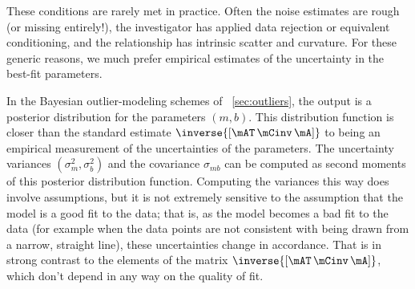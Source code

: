 \documentclass[12pt,twoside,pdftex]{article}
\begin{document}
These conditions are rarely met in practice.  Often the noise
estimates are rough (or missing entirely!), the investigator has
applied data rejection or equivalent conditioning, and the
relationship has intrinsic scatter and curvature.  For these
generic reasons, we much prefer empirical estimates of the uncertainty
in the best-fit parameters.

In the Bayesian outlier-modeling schemes of
\sectionname~\ref{sec:outliers}, the output is a
posterior distribution for the parameters $(m,b)$.  This distribution
function is closer than the standard estimate
$\inverse{\left[\mAT\,\mCinv\,\mA\right]}$ to being an
empirical measurement of the uncertainties of the parameters.  The
uncertainty variances $(\sigma_m^2,\sigma_b^2)$ and the covariance
$\sigma_{mb}$ can be computed as second moments of this posterior
distribution function.  Computing the variances this way does involve
assumptions, but it is not extremely sensitive to the assumption that
the model is a good fit to the data; that is, as the model becomes a
bad fit to the data (for example when the data points are not
consistent with being drawn from a narrow, straight line), these
uncertainties change in accordance.  That is in strong contrast to the
elements of the matrix $\inverse{\left[\mAT\,\mCinv\,\mA\right]}$,
which don't depend in any way on the quality of fit.
\end{document}
